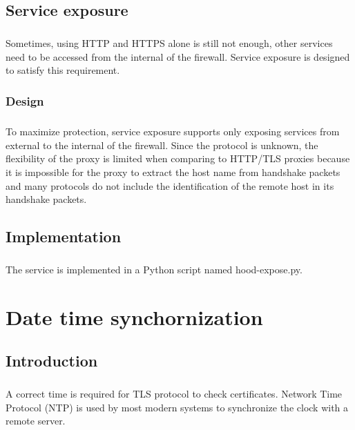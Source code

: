 \documentclass[mscthesis]{usiinfthesis}
\begin{document}
\section{Service exposure}
\paragraph{}
Sometimes, using HTTP and HTTPS alone is still not enough, other services need to be accessed from the internal of the firewall. Service exposure is designed to satisfy this requirement.

\subsection{Design}
\paragraph{}
To maximize protection, service exposure supports only exposing services from external to the internal of the firewall. Since the protocol is unknown, the flexibility of the proxy is limited when comparing to HTTP/TLS proxies because it is impossible for the proxy to extract the host name from handshake packets and many protocols do not include the identification of the remote host in its handshake packets.

\section{Implementation}
\paragraph{}
The service is implemented in a Python script named hood-expose.py.


\chapter{Date time synchornization}\label{cha:time}
\section{Introduction}
\paragraph{}
A correct time is required for TLS protocol to check certificates. Network Time Protocol (NTP) is used by most modern systems to synchronize the clock with a remote server.
\end{document}

